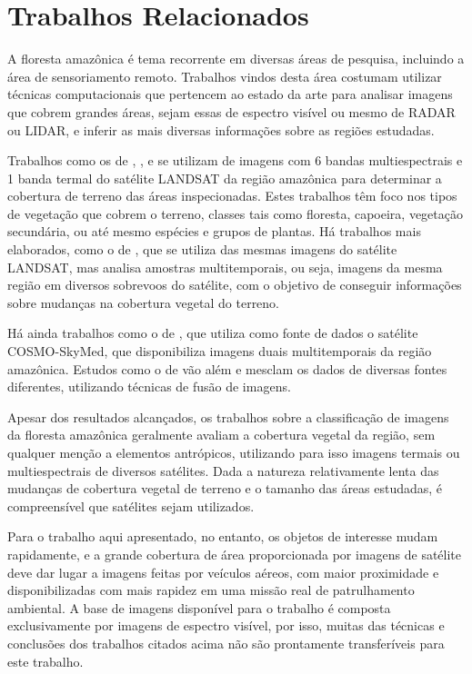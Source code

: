 \chapter{Trabalhos Relacionados}\label{cap:trabalhos}

A floresta amazônica é tema recorrente em diversas áreas de pesquisa, incluindo a área de sensoriamento remoto. Trabalhos vindos desta área costumam utilizar técnicas computacionais que pertencem ao estado da arte para analisar imagens que cobrem grandes áreas, sejam essas de espectro visível ou mesmo de RADAR ou LIDAR, e inferir as mais diversas informações sobre as regiões estudadas.

Trabalhos como os de , ,  e  se utilizam de imagens com 6 bandas multiespectrais e 1 banda termal do satélite LANDSAT da região amazônica para determinar a cobertura de terreno das áreas inspecionadas. Estes trabalhos têm foco nos tipos de vegetação que cobrem o terreno, classes tais como floresta, capoeira, vegetação secundária, ou até mesmo espécies e grupos de plantas. Há trabalhos mais elaborados, como o de , que se utiliza das mesmas imagens do satélite LANDSAT, mas analisa amostras multitemporais, ou seja, imagens da mesma região em diversos sobrevoos do satélite, com o objetivo de conseguir informações sobre mudanças na cobertura vegetal do terreno.

Há ainda trabalhos como o de , que utiliza como fonte de dados o satélite COSMO-SkyMed,  que disponibiliza imagens duais multitemporais da região amazônica. Estudos como o de  vão além e mesclam os dados de diversas fontes diferentes, utilizando técnicas de fusão de imagens.

Apesar dos resultados alcançados, os trabalhos sobre a classificação de imagens da floresta amazônica geralmente avaliam a cobertura vegetal da região, sem qualquer menção a elementos antrópicos, utilizando para isso imagens termais ou multiespectrais de diversos satélites. Dada a natureza relativamente lenta das mudanças de cobertura vegetal de terreno e o tamanho das áreas estudadas, é compreensível que satélites sejam utilizados.

Para o trabalho aqui apresentado, no entanto, os objetos de interesse mudam rapidamente, e a grande cobertura de área proporcionada por imagens de satélite deve dar lugar a imagens feitas por veículos aéreos, com maior proximidade e disponibilizadas com mais rapidez em uma missão real de patrulhamento ambiental. A base de imagens disponível para o trabalho é composta exclusivamente por imagens de espectro visível, por isso, muitas das técnicas e conclusões dos trabalhos citados acima não são prontamente transferíveis para este trabalho.

